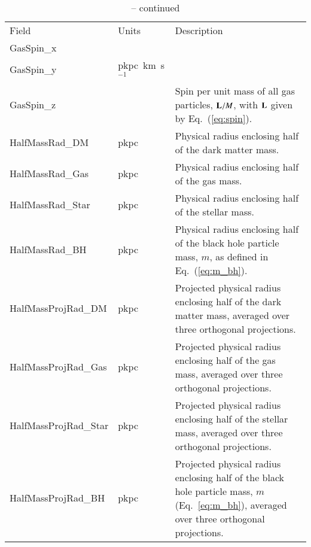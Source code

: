 \setcounter{table}{0}
\renewcommand\thetable{\Alph{section}.\arabic{table}}
\begin{table*}
\caption{ -- continued}
\label{table:subhalo2}
\begin{center}
\footnotesize
\renewcommand{\arraystretch}{1.5}
\begin{tabular}{ >{\ttfamily}p{4cm}p{1.5cm}p{11cm}}
{\large \bf SubHalo} & & \\
\hline
\normalfont Field & Units & Description \\
\hline\hline


GasSpin\_x & & \\
GasSpin\_y & pkpc~km~s$^{-1}$ & \\
GasSpin\_z & & \multirow{-3}{11cm}{Spin per unit mass of all gas particles, ${\bf L}/M$, with ${\bf L}$ given by Eq.~(\ref{eq:spin}).}\\

HalfMassRad\_DM &
pkpc &
Physical radius enclosing half of the dark matter mass.\\

HalfMassRad\_Gas &
pkpc &
Physical radius enclosing half of the gas mass.\\

HalfMassRad\_Star &
pkpc &
Physical radius enclosing half of the stellar mass.\\

HalfMassRad\_BH &
pkpc &
Physical radius enclosing half of the black hole particle mass, $m$, as defined in Eq.~(\ref{eq:m_bh}). \\

HalfMassProjRad\_DM &
pkpc &
Projected physical radius enclosing half of the dark matter mass, averaged over three orthogonal projections.\\

HalfMassProjRad\_Gas &
pkpc &
Projected physical radius enclosing half of the gas mass, averaged over three orthogonal projections.\\

HalfMassProjRad\_Star &
pkpc &
Projected physical radius enclosing half of the stellar mass, averaged over three orthogonal projections.\\

HalfMassProjRad\_BH &
pkpc &
Projected physical radius enclosing half of the black hole particle mass, $m$ (Eq.~\ref{eq:m_bh}), averaged over three orthogonal projections.\\


\end{tabular}
\end{center}
\end{table*}
